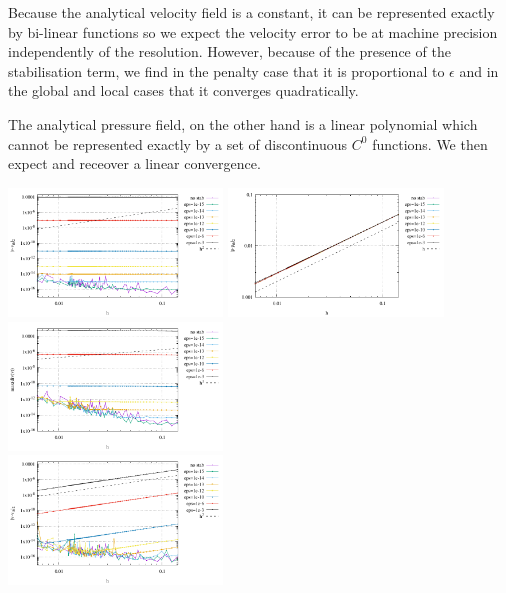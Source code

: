Because the analytical velocity field is a constant, it can be represented exactly 
by bi-linear functions so we expect the velocity error to be at machine precision
independently of the resolution. However, because of the presence of the stabilisation
term, we find in the penalty case that it is proportional to $\epsilon$ and 
in the global and local cases that it converges quadratically.

The analytical pressure field, on the other hand is a linear polynomial which cannot 
be represented exactly by a set of discontinuous $C^0$ functions. We then expect and receover 
a linear convergence.


\begin{center}
\includegraphics[width=5.7cm]{python_codes/fieldstone_115/results/aquarium/errorsV_penalty.pdf}
\includegraphics[width=5.7cm]{python_codes/fieldstone_115/results/aquarium/errorsP_penalty.pdf}
\includegraphics[width=5.7cm]{python_codes/fieldstone_115/results/aquarium/divv_penalty.pdf}\\
\includegraphics[width=5.7cm]{python_codes/fieldstone_115/results/aquarium/errorsV_global.pdf}

\end{center}
